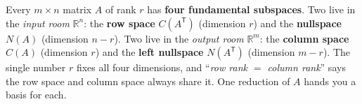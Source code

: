 \documentclass[10pt]{article}
\begin{document}
\vspace{0.10in}

\begin{remindbox}
\small Every $m\times n$ matrix $A$ of rank $r$ has \textbf{four fundamental subspaces}. Two live in the
\emph{input room} $\mathbb{R}^n$: the \textbf{row space} $C(A^{\mathsf T})$ (dimension $r$) and the
\textbf{nullspace} $N(A)$ (dimension $n-r$). Two live in the \emph{output room} $\mathbb{R}^m$: the
\textbf{column space} $C(A)$ (dimension $r$) and the \textbf{left nullspace} $N(A^{\mathsf T})$ (dimension
$m-r$). The single number $r$ fixes all four dimensions, and ``\emph{row rank $=$ column rank}'' says the
row space and column space always share it. One reduction of $A$ hands you a basis for each.
\end{remindbox}
\end{document}
